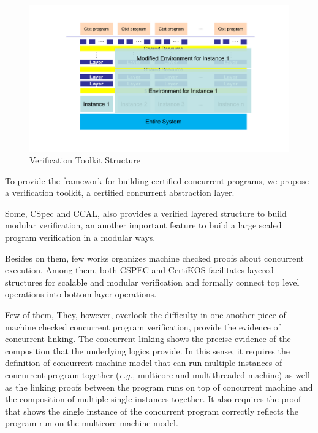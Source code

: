 \begin{figure}
\includegraphics[width=\textwidth]{figs/intro}
\caption{Verification Toolkit Structure}
\label{chapter:intro:verification-toolkit-structure} 
\end{figure}

To provide the 
framework for building certified concurrent programs, 
we propose 
a verification toolkit, a certified concurrent abstraction layer. 





Some, CSpec and CCAL, also provides a verified layered structure to build modular verification, an another important 
feature to build a large scaled program verification in a modular ways.


Besides on them, few works  
organizes machine checked proofs 
about concurrent execution. 
Among them, both CSPEC and CertiKOS facilitates layered structures 
for scalable and modular verification and formally connect top level operations into bottom-layer operations.

Few of them, 
They, however, overlook the difficulty in one another piece of machine checked concurrent program verification, 
provide the evidence of concurrent linking.
The concurrent linking shows 
the precise evidence of the composition that the underlying logics provide. 
In this sense, 
it requires the definition of 
concurrent machine model that can run multiple instances of concurrent program together (\textit{e.g.,} multicore and multithreaded machine) 
as well as 
the linking proofs between the program runs on top of concurrent machine and the composition of multiple single instances together. 
It also requires the proof that 
shows the single instance of the concurrent program correctly reflects
the program run on the multicore machine model. 

